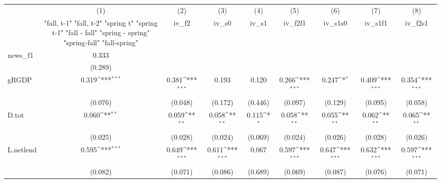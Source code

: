 {
\def\sym#1{\ifmmode^{#1}\else\(^{#1}\)\fi}
\begin{tabular}{l*{8}{c}}
\toprule
            &\multicolumn{1}{c}{(1)}&\multicolumn{1}{c}{(2)}&\multicolumn{1}{c}{(3)}&\multicolumn{1}{c}{(4)}&\multicolumn{1}{c}{(5)}&\multicolumn{1}{c}{(6)}&\multicolumn{1}{c}{(7)}&\multicolumn{1}{c}{(8)}\\
            &\multicolumn{1}{c}{  "fall, t-1" "fall, t-2" "spring t" "spring t-1"  "fall - fall" "spring - spring" "spring-fall" "fall-spring" }&\multicolumn{1}{c}{iv\_f2}&\multicolumn{1}{c}{iv\_s0}&\multicolumn{1}{c}{iv\_s1}&\multicolumn{1}{c}{iv\_f2f1}&\multicolumn{1}{c}{iv\_s1s0}&\multicolumn{1}{c}{iv\_s1f1}&\multicolumn{1}{c}{iv\_f2s1}\\
\midrule
news\_f1     &       0.333         &                     &                     &                     &                     &                     &                     &                     \\
            &     (0.289)         &                     &                     &                     &                     &                     &                     &                     \\
\addlinespace
gRGDP       &       0.319\sym{***}&       0.381\sym{***}&       0.193         &       0.120         &       0.266\sym{***}&       0.247\sym{*}  &       0.409\sym{***}&       0.354\sym{***}\\
            &     (0.076)         &     (0.048)         &     (0.172)         &     (0.446)         &     (0.097)         &     (0.129)         &     (0.095)         &     (0.058)         \\
\addlinespace
D.tot       &       0.060\sym{**} &       0.059\sym{**} &       0.058\sym{**} &       0.115\sym{*}  &       0.058\sym{**} &       0.055\sym{**} &       0.062\sym{**} &       0.065\sym{**} \\
            &     (0.025)         &     (0.028)         &     (0.024)         &     (0.069)         &     (0.024)         &     (0.026)         &     (0.028)         &     (0.026)         \\
\addlinespace
L.netlend   &       0.595\sym{***}&       0.649\sym{***}&       0.611\sym{***}&       0.067         &       0.597\sym{***}&       0.647\sym{***}&       0.632\sym{***}&       0.597\sym{***}\\
            &     (0.082)         &     (0.071)         &     (0.086)         &     (0.689)         &     (0.069)         &     (0.087)         &     (0.076)         &     (0.071)         \\

\end{tabular}}
